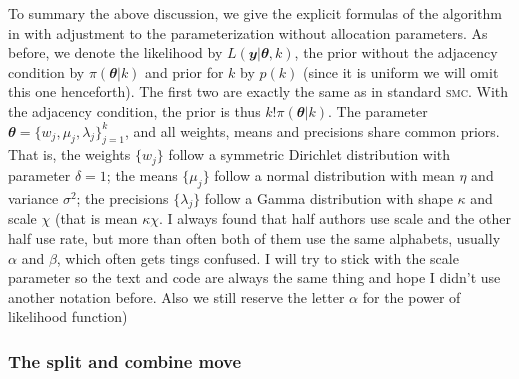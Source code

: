 \documentclass[11pt, linespread = 1.1, lines=40, lineratio = 30, bib,
fontset = Minion]{marticle}
\def\smc{\textsc{smc}\xspace}
\def\btheta{\mathbfit{\theta}}
\def\by{\mathbfit{y}}
\begin{document}
  To summary the above discussion, we give the explicit formulas of the
  algorithm in \textcite{Richardson:1997ea} with adjustment to the
  parameterization without allocation parameters. As before, we denote the
  likelihood by $L(\by|\btheta,k)$, the prior without the adjacency condition
  by $\pi(\btheta|k)$ and prior for $k$ by $p(k)$ (since it is uniform we will
  omit this one henceforth). The first two are exactly the same as in standard
  \smc. With the adjacency condition, the prior is thus $k!\pi(\btheta|k)$.
  The parameter $\btheta = \{w_j, \mu_j, \lambda_j\}_{j=1}^k$, and all
  weights, means and precisions share common priors. That is, the weights
  $\{w_j\}$ follow a symmetric Dirichlet distribution with parameter $\delta =
  1$; the means $\{\mu_j\}$ follow a normal distribution with mean $\eta$ and
  variance $\sigma^2$; the precisions $\{\lambda_j\}$ follow a Gamma
  distribution with shape $\kappa$ and scale $\chi$ (that is mean
  $\kappa\chi$. I always found that half authors use scale and the other half
  use rate, but more than often both of them use the same alphabets, usually
  $\alpha$ and $\beta$, which often gets tings confused. I will try to stick
  with the scale parameter so the text and code are always the same thing and
  hope I didn't use another notation before. Also we still reserve the letter
  $\alpha$ for the power of likelihood function)

  \subsubsection{The split and combine move}
\end{document}
